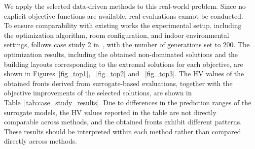 \documentclass[conference]{IEEEtran}
\begin{document}
We apply the selected data-driven methods to this real-world problem. Since no explicit objective functions are available, real evaluations cannot be conducted. To ensure comparability with existing works the experimental setup, including the optimization algorithm, room configuration, and indoor environmental settings, follows case study 2 in~\cite{building_opt2}, with the number of generations set to 200. The optimization results, including the obtained non-dominated solutions and the building layouts corresponding to the extremal solutions for each objective, are shown in Figures~\ref{fig_top1}, ~\ref{fig_top2} and ~\ref{fig_top3}. The HV values of the obtained fronts derived from surrogate-based evaluations, together with the objective improvements of the selected solutions, are shown in Table~\ref{tab:case_study_results}. Due to differences in the prediction ranges of the surrogate models, the HV values reported in the table are not directly comparable across methods, and the obtained fronts exhibit different patterns. These results should be interpreted within each method rather than compared directly across methods.
\end{document}
